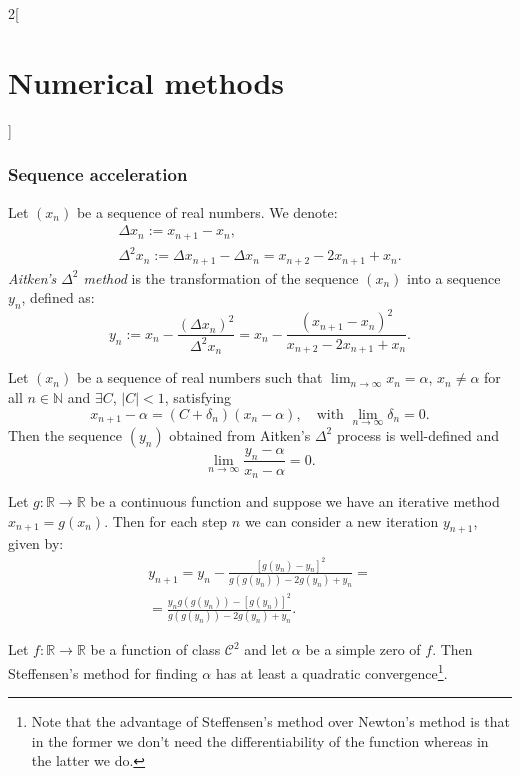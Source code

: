 \documentclass[class=article,10pt,crop=false]{standalone}
\begin{document}
\begin{multicols}{2}[\section{Numerical methods}]
\subsubsection*{Sequence acceleration}
\begin{definition}
Let $(x_n)$ be a sequence of real numbers. We denote:
\begin{gather*}
    \Delta x_n:=x_{n+1}-x_n,\\\Delta^2 x_n:=\Delta x_{n+1}-\Delta x_n=x_{n+2}-2x_{n+1}+x_n.
\end{gather*}
\textit{Aitken's $\Delta^2$ method} is the transformation of the sequence $(x_n)$ into a sequence $y_n$, defined as: $$y_n:=x_n-\frac{(\Delta x_n)^2}{\Delta^2 x_n}=x_n-\frac{(x_{n+1}-x_n)^2}{x_{n+2}-2x_{n+1}+x_n}.$$
\end{definition}
\begin{theorem}
Let $(x_n)$ be a sequence of real numbers such that $\displaystyle\lim_{n\to\infty}x_n=\alpha$, $x_n\ne\alpha$ for all $n\in\mathbb{N}$ and $\exists C$, $|C|<1$, satisfying $$x_{n+1}-\alpha=(C+\delta_n)(x_n-\alpha),\quad\text{with }\lim_{n\to\infty}\delta_n=0.$$ Then the sequence $(y_n)$ obtained from Aitken's $\Delta^2$ process is well-defined and $$\lim_{n\to\infty}\frac{y_n-\alpha}{x_n-\alpha}=0.$$
\end{theorem}
\begin{theorem}
Let $g:\mathbb{R}\rightarrow\mathbb{R}$ be a continuous function and suppose we have an iterative method $x_{n+1}=g(x_n)$. Then for each step $n$ we can consider a new iteration $y_{n+1}$, given by: \begin{multline*}
    y_{n+1}=y_n-\frac{\left[g(y_n)-y_n\right]^2}{g(g(y_n))-2g(y_n)+y_n}=\\=\frac{y_ng(g(y_n))-\left[g(y_n)\right]^2}{g(g(y_n))-2g(y_n)+y_n}.
\end{multline*}
\end{theorem}
\begin{prop}
Let $f:\mathbb{R}\rightarrow\mathbb{R}$ be a function of class $\mathcal{C}^2$ and let $\alpha$ be a simple zero of $f$. Then Steffensen's method for finding $\alpha$ has at least a quadratic convergence\footnote{Note that the advantage of Steffensen's method over Newton's method is that in the former we don't need the differentiability of the function whereas in the latter we do.}.
\end{prop}

\end{multicols}
\end{document}
